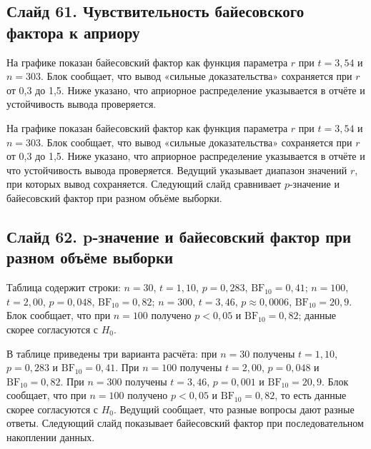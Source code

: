 \documentclass[11pt,a4paper]{article}
\begin{document}
\subsection*{Слайд 61. Чувствительность байесовского фактора к априору}
\begin{onslide}
На графике показан байесовский фактор как функция параметра $r$ при $t = 3{,}54$ и $n = 303$. Блок сообщает, что вывод «сильные доказательства» сохраняется при $r$ от 0,3 до 1,5. Ниже указано, что априорное распределение указывается в отчёте и устойчивость вывода проверяется.
\end{onslide}
На графике показан байесовский фактор как функция параметра $r$ при $t = 3{,}54$ и $n = 303$. Блок сообщает, что вывод «сильные доказательства» сохраняется при $r$ от 0,3 до 1,5. Ниже указано, что априорное распределение указывается в отчёте и что устойчивость вывода проверяется. Ведущий указывает диапазон значений $r$, при которых вывод сохраняется. Следующий слайд сравнивает $p$-значение и байесовский фактор при разном объёме выборки.

\subsection*{Слайд 62. p-значение и байесовский фактор при разном объёме выборки}
\begin{onslide}
Таблица содержит строки: $n = 30$, $t = 1{,}10$, $p = 0{,}283$, $\mathrm{BF}_{10} = 0{,}41$; $n = 100$, $t = 2{,}00$, $p = 0{,}048$, $\mathrm{BF}_{10} = 0{,}82$; $n = 300$, $t = 3{,}46$, $p \approx 0{,}0006$, $\mathrm{BF}_{10} = 20{,}9$. Блок сообщает, что при $n = 100$ получено $p < 0{,}05$ и $\mathrm{BF}_{10} = 0{,}82$; данные скорее согласуются с $H_0$.
\end{onslide}
В таблице приведены три варианта расчёта: при $n = 30$ получены $t = 1{,}10$, $p = 0{,}283$ и $\mathrm{BF}_{10} = 0{,}41$. При $n = 100$ получены $t = 2{,}00$, $p = 0{,}048$ и $\mathrm{BF}_{10} = 0{,}82$. При $n = 300$ получены $t = 3{,}46$, $p = 0{,}001$ и $\mathrm{BF}_{10} = 20{,}9$. Блок сообщает, что при $n = 100$ получено $p < 0{,}05$ и $\mathrm{BF}_{10} = 0{,}82$, то есть данные скорее согласуются с $H_0$. Ведущий сообщает, что разные вопросы дают разные ответы. Следующий слайд показывает байесовский фактор при последовательном накоплении данных.
\end{document}
